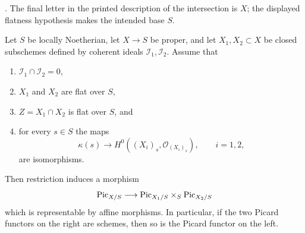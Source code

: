 \begin{proposition}
\label{proposition-picard-closed-union-affine}
\begin{reference}
\cite[Expos\'e 232, Proposition 6.3, pp. 158--159]{FGA}. The final letter
in the printed description of the intersection is $X$; the displayed
flatness hypothesis makes the intended base $S$.
\end{reference}
Let $S$ be locally Noetherian, let $X \to S$ be proper, and let
$X_1, X_2 \subset X$ be closed subschemes defined by coherent ideals
$\mathcal{I}_1, \mathcal{I}_2$. Assume that
\begin{enumerate}
\item $\mathcal{I}_1 \cap \mathcal{I}_2 = 0$,
\item $X_1$ and $X_2$ are flat over $S$,
\item $Z = X_1 \cap X_2$ is flat over $S$, and
\item for every $s \in S$ the maps
$$
\kappa(s) \longrightarrow
H^0((X_i)_s, \mathcal{O}_{(X_i)_s}), \qquad i = 1, 2,
$$
are isomorphisms.
\end{enumerate}
Then restriction induces a morphism
\begin{equation}
\label{equation-picard-closed-union}
\mathrm{Pic}_{X/S} \longrightarrow
\mathrm{Pic}_{X_1/S} \times_S \mathrm{Pic}_{X_2/S}
\end{equation}
which is representable by affine morphisms. In particular, if the two
Picard functors on the right are schemes, then so is the Picard functor on
the left.
\end{proposition}

